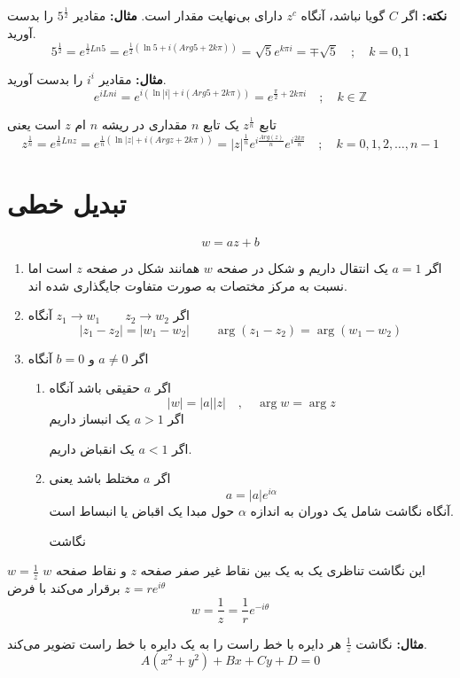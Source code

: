 \documentclass[12pt]{report}
\begin{document}
	 \textbf{نکته:}
	 اگر 
	 $C$
	 گویا نباشد، آنگاه 
	 $z^c$
	 دارای بی‌نهایت مقدار است.
	 \textbf{مثال:}
	 مقادیر
	 $5^\frac{1}{2}$
	 را بدست آورید.
	 $$	 5^\frac{1}{2} = e^{\frac{1}{2} Ln 5} = e^{\frac{1}{2}(\ln 5 + i(Arg 5 + 2k\pi))} = \sqrt{5} e^{k\pi i } = \mp \sqrt{5} \quad;\quad k = 0, 1$$
	 
	 \textbf{مثال:}
	 مقادیر
	 $i^i$
	 را بدست آورید.
	 $$ e^{i Ln i} = e^{i(\ln |i| + i(Arg 5 + 2k\pi))} =  e^{\frac{\pi}{2}+2k\pi i } \quad;\quad k \in \mathbb{Z}$$
	 
	 تابع
	 $z^\frac{1}{n}$
	 یک تابع 
	 $n$
	 مقداری در ریشه 
	 $n$
	 ام 
	 $z$
	 است یعنی
	 $$z^\frac{1}{n} = e^{\frac{1}{n} Ln z} = e^{\frac{1}{n}(\ln |z| + i(Arg z + 2k\pi))} = |z|^\frac{1}{n} e^{i\frac{Arg(z)}{n}} e^{i\frac{2k\pi}{n}} \quad;\quad k = 0, 1, 2, \dots, n-1$$
	 
	 \section{تبدیل خطی}
	 $$w = az + b$$
	 \begin{enumerate}
	 	\item 
	 	اگر 
	 	$a=1$
	 	یک انتقال داریم و شکل در صفحه 
	 	$w$
	 	همانند شکل در صفحه 
	 	$z$
	 	است اما نسبت به مرکز مختصات به صورت متفاوت  جایگذاری شده اند.
	 	\item
	 	اگر 
	 	$z_1 \rightarrow w_1 \qquad z_2 \rightarrow w_2$
	 	آنگاه
	 	$$|z_1 - z_2| = |w_1 - w_2| \qquad \arg(z_1- z_2) = \arg(w_1 - w_2)$$
	 	\item
	 	اگر
	 	$a\neq 0$
	 	و
	 	$b =0 $
	 	آنگاه
	 	\begin{enumerate}
	 		\item 
	 		اگر 
	 		$a$
	 		حقیقی باشد آنگاه 
	 		$$|w| = |a||z| \quad, \quad \arg w = \arg z$$
	 		اگر 
	 		$a>1$
	 		یک انبساز داریم
	 		
	 		اگر 
	 		$a<1$
	 		یک انقباض داریم.
	 		\item
	 		اگر
	 		$a$
	 		مختلط باشد یعنی
	 		$$a = |a| e^{i\alpha}$$
	 		آنگاه نگاشت شامل یک دوران به اندازه
	 		$\alpha$
	 		حول مبدا یک اقباض یا انبساط است.
	 		
	 		نگاشت 
	 		
	 	\end{enumerate}
	 \end{enumerate}
	 $w = \frac{1}{z}$
	 این نگاشت تناظری یک به یک بین نقاط غیر صفر صفحه 
	 $z$
	 و نقاط صفحه 
	 $w$
	 برقرار می‌کند با فرض
	 $z = re^{i\theta}$
	 $$w = \frac{1}{z}= \frac{1}{r} e^{-i\theta}$$
	 
	 \textbf{مثال:}
	 نگاشت
	 $\frac{1}{z}$
	 هر دایره با خط راست را به یک دایره با خط راست تضویر می‌کند.
	 \begin{equation}\label{eq1}
	 	A(x^2+y^2) + Bx + Cy + D = 0
	 \end{equation}
	 
\end{document}
